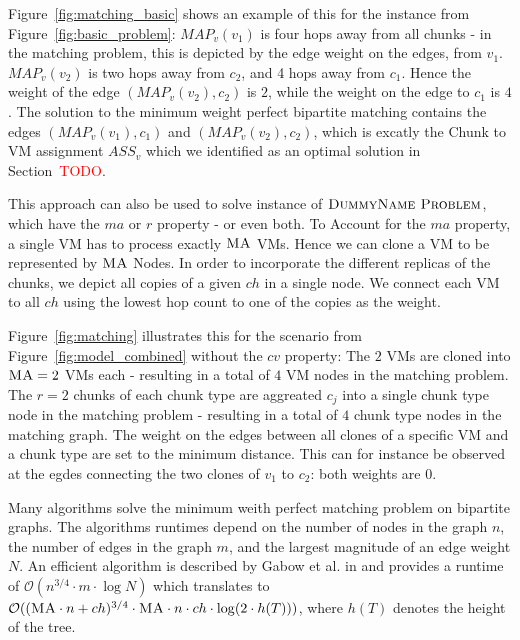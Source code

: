 \documentclass[9pt,twocolumn]{scrartcl}
\newcommand{\Chunk}{\ensuremath{c}}
\newcommand{\Problem}{\textsc{DummyName Problem}}
\newcommand{\carlo}[1]{\textcolor{red}{#1}}
\newcommand{\MaFactor}{\ensuremath{\textsc{MA}}}
\newcommand{\RedundancyFactor}{\ensuremath{r}}
\newcommand{\VmChunkAssignment}{\ensuremath{ASS_v}}
\newcommand{\NodeMapping}{\ensuremath{MAP_v}}
\newcommand{\ChunkType}{\ensuremath{textsc{ct}}}
\newcommand{\VirtualNode}{\ensuremath{v}}
\newcommand{\Tree}{\ensuremath{T}}
\newcommand{\Vms}{\ensuremath{n}}
\newcommand{\ChunkTypes}{\ensuremath{ch}}
\begin{document}
Figure~\ref{fig:matching_basic} shows an example of this for the instance from
Figure~\ref{fig:basic_problem}: $\NodeMapping(\VirtualNode_1)$ is four hops
away from all chunks - in the matching problem, this is depicted by the edge
weight on the edges, from $\VirtualNode_1$. $\NodeMapping(\VirtualNode_2)$ is
two hops away from $\Chunk_2$, and 4 hops away from $\Chunk_1$. Hence the
weight of the edge $(\NodeMapping(\VirtualNode_2),\Chunk_2)$ is $2$, while the
weight on the edge to $\Chunk_1$ is $4$. The solution to the minimum weight
perfect bipartite matching contains the edges $(\NodeMapping(\VirtualNode_1),
\Chunk_1)$ and $(\NodeMapping(\VirtualNode_2),
\Chunk_2)$, which is excatly the Chunk to VM assignment $\VmChunkAssignment$
which we identified as an optimal solution in Section~\carlo{TODO}.


This approach can also be used to solve instance of $\Problem$, which have the
$ma$ or $r$ property - or even both.
To Account for the $ma$ property, a single VM has to process exactly
$\MaFactor$ VMs. Hence we can clone a VM to be represented by $\MaFactor$ Nodes.
In order to incorporate the different
replicas of the chunks, we depict all copies of a given $\ChunkTypes$ in a
single %
node. We connect each VM to all $\ChunkTypes$ using the
lowest hop count to one of the copies as the weight.

Figure~\ref{fig:matching} illustrates this for the scenario from
Figure~\ref{fig:model_combined} without the $cv$ property: The $2$ VMs are
cloned into $\MaFactor = 2$ VMs each - resulting in a total of $4$ VM nodes in
the matching problem. The $\RedundancyFactor = 2$ chunks of each chunk type are
aggreated $\Chunk_j$ into a single chunk type node in the matching problem -
resulting in a total of $4$ chunk type nodes in the matching graph. The weight
on the edges between all clones of a specific VM and a chunk type are set to
the minimum distance. This can for instance be observed at the egdes connecting
the two clones of $\VirtualNode_1$ to $\Chunk_2$: both weights are 0.



Many algorithms solve the minimum weith perfect matching problem on bipartite
graphs. The algorithms runtimes depend on  the number of nodes in the
graph $n$, the number of edges in the graph $m$, and the largest magnitude of
an edge weight $N$. An efficient algorithm is described by Gabow et al. in
\cite{gabow_scaling_algorithm} and provides a runtime of $\mathcal{O}(n^{3/4}
\cdot m \cdot \log N)$ which translates to $\mathcal{O}((\MaFactor \cdot \Vms +
\ChunkTypes)^{3/4} \cdot  \MaFactor \cdot \Vms \cdot \ChunkTypes \cdot \log
(2 \cdot h(\Tree)))$, where $h(T)$ denotes the height of the tree. 
\end{document}

